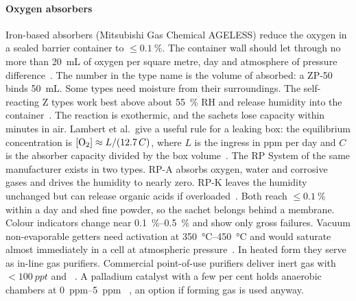 \paragraph{Oxygen absorbers} Iron-based absorbers (Mitsubishi Gas Chemical AGELESS) reduce the oxygen
in a sealed barrier container to $\leq\SI{0.1}{\percent}$. The container wall should let through no more
than \SI{20}{mL} of oxygen per square metre, day and atmosphere of pressure difference~\cite{MGCAgeless}. The number in the type name is the volume of
\Oxy{} absorbed: a ZP-50 binds \SI{50}{mL}. Some types need moisture from their surroundings. The
self-reacting Z types work best above about \SI{55}{\percent} RH and release humidity into the
container~\cite{Daniel1993}. The reaction is exothermic, and the sachets lose capacity within minutes in
air. Lambert et al.\ give a useful rule for a leaking box: the equilibrium concentration is
$[\Oxy]\approx L/(12.7\,C)$, where $L$ is the ingress in ppm per day and $C$ is the absorber capacity
divided by the box volume~\cite{Lambert1992}. The RP System of the same manufacturer exists in two
types. RP-A absorbs oxygen, water and corrosive gases and drives the humidity to nearly zero. RP-K
leaves the humidity unchanged but can release organic acids if overloaded~\cite{MGCRP}. Both reach
$\leq\SI{0.1}{\percent}$ \Oxy{} within a day and shed fine powder, so the sachet belongs behind a
membrane. Colour indicators change near \SIrange{0.1}{0.5}{\percent} \Oxy{} and show only gross
failures. Vacuum non-evaporable getters need activation at \SIrange{350}{450}{\celsius} and would
saturate almost immediately in a cell at atmospheric pressure~\cite{SAESSorbAC}. In heated form they serve
as in-line gas purifiers. Commercial point-of-use purifiers deliver inert gas with
$<\SI{100}{ppt}$ \Oxy{} and \water{}~\cite{EntegrisHX}. A palladium catalyst with a few per cent \Htwo{}
holds anaerobic chambers at \SIrange{0}{5}{ppm} \Oxy~\cite{Coy}, an option if forming gas is used anyway.

